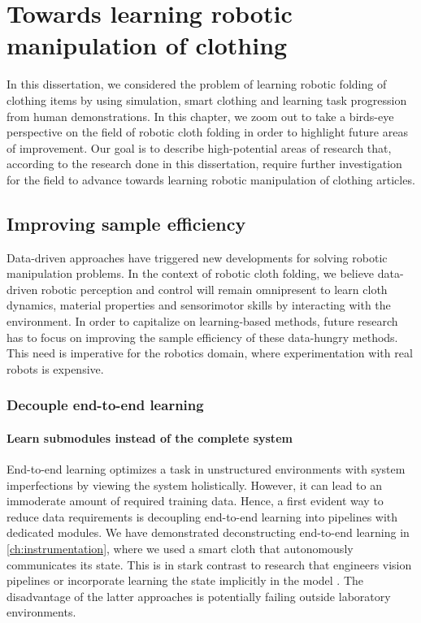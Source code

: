 \documentclass[\home/main.tex]{subfiles}
\begin{document}

\chapter{Towards learning robotic manipulation of clothing} \label{ch:towards_robotic_folding}

In this dissertation, we considered the problem of learning robotic folding of clothing items by using simulation, smart clothing and learning task progression from human demonstrations. In this chapter, we zoom out to take a birds-eye perspective on the field of robotic cloth folding in order to highlight future areas of improvement. Our goal is to describe high-potential areas of research that, according to the research done in this dissertation, require further investigation for the field to advance towards learning robotic manipulation of clothing articles.

\section{Improving sample efficiency}

Data-driven approaches have triggered new developments for solving robotic manipulation problems. In the context of robotic cloth folding, we believe data-driven robotic perception and control will remain omnipresent to learn cloth dynamics, material properties and sensorimotor skills by interacting with the environment. In order to capitalize on learning-based methods, future research has to focus on improving the sample efficiency of these data-hungry methods. This need is imperative for the robotics domain, where experimentation with real robots is expensive.

\subsection{Decouple end-to-end learning}
\subsubsection{Learn submodules instead of the complete system}
End-to-end learning optimizes a task in unstructured environments with system imperfections by viewing the system holistically. However, it can lead to an immoderate amount of required training data. Hence, a first evident way to reduce data requirements is decoupling end-to-end learning into pipelines with dedicated modules.
We have demonstrated deconstructing end-to-end learning in \cref{ch:instrumentation}, where we used a smart cloth that autonomously communicates its state. This is in stark contrast to research that engineers vision pipelines \autocite{Wu2020} or incorporate learning the state implicitly in the model \autocite{Matas2018}. The disadvantage of the latter approaches is potentially failing outside laboratory environments.
\end{document}
